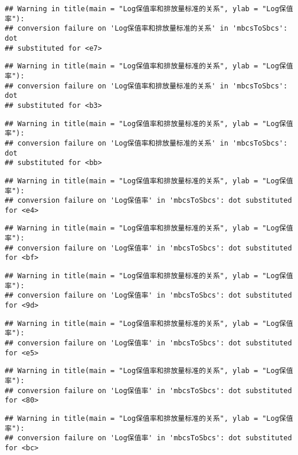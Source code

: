 \documentclass[]{article}
\begin{document}
\begin{verbatim}
## Warning in title(main = "Log保值率和排放量标准的关系", ylab = "Log保值率"):
## conversion failure on 'Log保值率和排放量标准的关系' in 'mbcsToSbcs': dot
## substituted for <e7>
\end{verbatim}

\begin{verbatim}
## Warning in title(main = "Log保值率和排放量标准的关系", ylab = "Log保值率"):
## conversion failure on 'Log保值率和排放量标准的关系' in 'mbcsToSbcs': dot
## substituted for <b3>
\end{verbatim}

\begin{verbatim}
## Warning in title(main = "Log保值率和排放量标准的关系", ylab = "Log保值率"):
## conversion failure on 'Log保值率和排放量标准的关系' in 'mbcsToSbcs': dot
## substituted for <bb>
\end{verbatim}

\begin{verbatim}
## Warning in title(main = "Log保值率和排放量标准的关系", ylab = "Log保值率"):
## conversion failure on 'Log保值率' in 'mbcsToSbcs': dot substituted for <e4>
\end{verbatim}

\begin{verbatim}
## Warning in title(main = "Log保值率和排放量标准的关系", ylab = "Log保值率"):
## conversion failure on 'Log保值率' in 'mbcsToSbcs': dot substituted for <bf>
\end{verbatim}

\begin{verbatim}
## Warning in title(main = "Log保值率和排放量标准的关系", ylab = "Log保值率"):
## conversion failure on 'Log保值率' in 'mbcsToSbcs': dot substituted for <9d>
\end{verbatim}

\begin{verbatim}
## Warning in title(main = "Log保值率和排放量标准的关系", ylab = "Log保值率"):
## conversion failure on 'Log保值率' in 'mbcsToSbcs': dot substituted for <e5>
\end{verbatim}

\begin{verbatim}
## Warning in title(main = "Log保值率和排放量标准的关系", ylab = "Log保值率"):
## conversion failure on 'Log保值率' in 'mbcsToSbcs': dot substituted for <80>
\end{verbatim}

\begin{verbatim}
## Warning in title(main = "Log保值率和排放量标准的关系", ylab = "Log保值率"):
## conversion failure on 'Log保值率' in 'mbcsToSbcs': dot substituted for <bc>
\end{verbatim}
\end{document}
